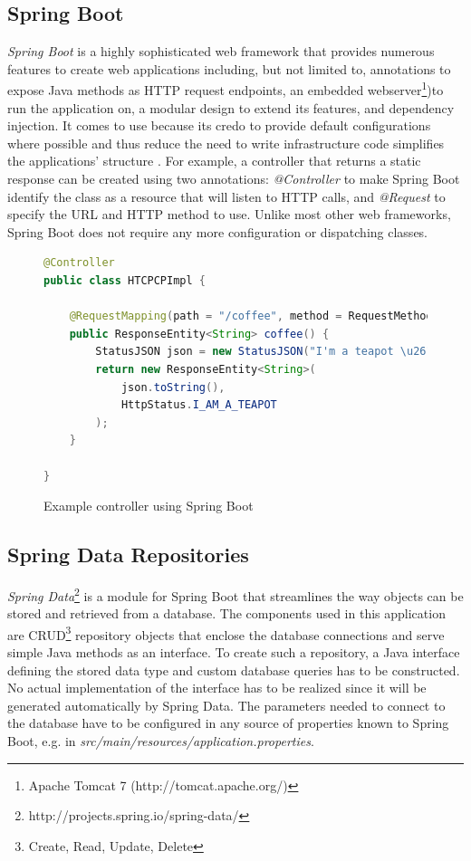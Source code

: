 \subsection{Spring Boot}
\textit{Spring Boot} is a highly sophisticated web framework that provides numerous features to create web applications including, but not limited to, annotations to expose Java methods as HTTP request endpoints, an embedded webserver\footnote{Apache Tomcat 7 (http://tomcat.apache.org/)})to run the application on, a modular design to extend its features, and dependency injection. It comes to use because its credo to provide default configurations where possible and thus reduce the need to write infrastructure code simplifies the applications' structure \cite[p. 6]{SpringGuide}.
For example, a controller that returns a static response can be created using two annotations:
\textit{@Controller} to make Spring Boot identify the class as a resource that will listen to HTTP calls, and \textit{@Request} to specify the URL and HTTP method to use. Unlike most other web frameworks, Spring Boot does not require any more configuration or dispatching classes.

\begin{figure}[h]
\begin{lstlisting}[language=Java]
@Controller
public class HTCPCPImpl {

	@RequestMapping(path = "/coffee", method = RequestMethod.GET)
	public ResponseEntity<String> coffee() {
		StatusJSON json = new StatusJSON("I'm a teapot \u2615");
		return new ResponseEntity<String>(
			json.toString(),
			HttpStatus.I_AM_A_TEAPOT
		);
	}

}
\end{lstlisting}
\caption[Code: Example Controller]{Example controller using Spring Boot}
\end{figure}

\newpage


\subsection{Spring Data Repositories}
\textit{Spring Data}\footnote{http://projects.spring.io/spring-data/} is a module for Spring Boot that streamlines the way objects can be stored and retrieved from a database. The components used in this application are CRUD\footnote{Create, Read, Update, Delete} repository objects that enclose the database connections and serve simple Java methods as an interface. To create such a repository, a Java interface defining the stored data type and custom database queries has to be constructed.
No actual implementation of the interface has to be realized since it will be generated automatically by Spring Data.
The parameters needed to connect to the database have to be configured in any source of properties known to Spring Boot, e.g. in \textit{src/main/resources/application.properties}.

